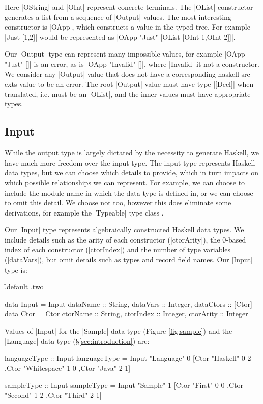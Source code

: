 \documentclass[preprint,draft]{sigplanconf}
\begin{document}
Here |OString| and |OInt| represent concrete terminals. The |OList| constructor generates a list from a sequence of  |Output| values. The most interesting constructor is |OApp|, which constructs a value in the typed tree. For example |Just [1,2]| would be represented as |OApp "Just" [OList [OInt 1,OInt 2]]|.

Our |Output| type can represent many impossible values, for example |OApp "Just" []| is an error, as is |OApp "Invalid" []|, where |Invalid| it not a constructor. We consider any |Output| value that does not have a corresponding haskell-src-exts value to be an error. The root |Output| value must have type |[Decl]| when translated, i.e. must be an |OList|, and the inner values must have appropriate types.

\subsection{Input}

While the output type is largely dictated by the necessity to generate Haskell, we have much more freedom over the input type. The input type represents Haskell data types, but we can choose which details to provide, which in turn impacts on which possible relationships we can represent. For example, we can choose to include the module name in which the data type is defined in, or we can choose to omit this detail. We choose not too, however this does eliminate some derivations, for example the |Typeable| type class \cite{lammel:syb}.

Our |Input| type represents algebraically constructed Haskell data types. We include details such as the arity of each constructor (|ctorArity|), the 0-based index of each constructor (|ctorIndex|) and the number of type variables (|dataVars|), but omit details such as types and record field names. Our |Input| type is:

\h{.default .two}\begin{code}
data Input = Input
    {dataName :: String, dataVars :: Integer, dataCtors :: [Ctor]}
data Ctor = Ctor
    {ctorName :: String, ctorIndex :: Integer, ctorArity :: Integer}
\end{code}

\noindent Values of |Input| for the |Sample| data type (Figure \ref{fig:sample}) and the |Language| data type (\S\ref{sec:introduction}) are:

\begin{code}
languageType :: Input
languageType = Input "Language" 0
    [Ctor "Haskell" 0 2
    ,Ctor "Whitespace" 1 0
    ,Ctor "Java" 2 1]

sampleType :: Input
sampleType = Input "Sample" 1
    [Ctor "First" 0 0
    ,Ctor "Second" 1 2
    ,Ctor "Third" 2 1]
\end{code}
\end{document}
